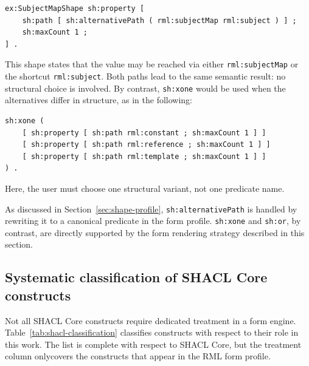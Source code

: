 \begin{verbatim}
ex:SubjectMapShape sh:property [
    sh:path [ sh:alternativePath ( rml:subjectMap rml:subject ) ] ;
    sh:maxCount 1 ;
] .
\end{verbatim}

This shape states that the value may be reached via either \texttt{rml:subjectMap}
or the shortcut \texttt{rml:subject}.
Both paths lead to the same semantic result: no structural choice is involved.
By contrast, \texttt{sh:xone} would be used when the alternatives differ in
structure, as in the following:

\begin{verbatim}
sh:xone (
    [ sh:property [ sh:path rml:constant ; sh:maxCount 1 ] ]
    [ sh:property [ sh:path rml:reference ; sh:maxCount 1 ] ]
    [ sh:property [ sh:path rml:template ; sh:maxCount 1 ] ]
) .
\end{verbatim}

Here, the user must choose one structural variant, not one predicate name.

As discussed in Section~\ref{sec:shape-profile}, \texttt{sh:alternativePath} is handled by rewriting it to a canonical predicate in the form profile.
\texttt{sh:xone} and \texttt{sh:or}, by contrast, are directly supported by the form rendering strategy described in this section.

\subsection{Systematic classification of SHACL Core constructs}

Not all SHACL Core constructs require dedicated treatment in a form engine.
Table~\ref{tab:shacl-classification} classifies constructs with respect to their role in this work.
The list is complete with respect to SHACL Core, but the treatment column onlycovers the constructs that appear in the RML form profile.

